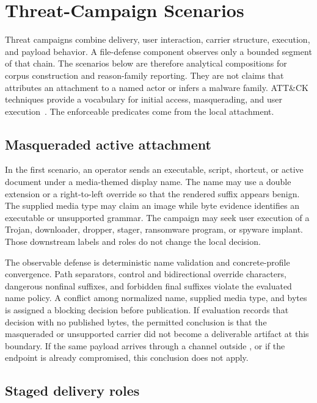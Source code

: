 \section{Threat-Campaign Scenarios}\label{sec:threat-campaigns}

Threat campaigns combine delivery, user interaction, carrier structure,
execution, and payload behavior. A file-defense component observes only a
bounded segment of that chain. The scenarios below are therefore analytical
compositions for corpus construction and reason-family reporting. They are not
claims that \AFD{} attributes an attachment to a named actor or infers a malware
family. ATT\&CK techniques provide a vocabulary for initial access,
masquerading, and user execution~\cite{mitreT1566001,mitreT1036002,
mitreT1036007,mitreT1036008,mitreT1204002}. The enforceable predicates come
from the local attachment.

\subsection{Masqueraded active attachment}

In the first scenario, an operator sends an executable, script, shortcut, or
active document under a media-themed display name. The name may use a double
extension or a right-to-left override so that the rendered suffix appears
benign. The supplied media type may claim an image while byte evidence identifies
an executable or unsupported grammar. The campaign may seek user execution of a
Trojan, downloader, dropper, stager, ransomware program, or spyware implant.
Those downstream labels and roles do not change the local decision.

The observable defense is deterministic name validation and concrete-profile
convergence. Path separators, control and bidirectional override characters,
dangerous nonfinal suffixes, and forbidden final suffixes violate the evaluated
name policy. A conflict among normalized name, supplied media type, and bytes
is assigned a blocking decision before publication. If evaluation records that
decision with no published bytes, the permitted conclusion is that the
masqueraded or unsupported carrier did not become a deliverable artifact at
this boundary. If the same payload arrives through a channel outside \AFD, or
if the endpoint is already compromised, this conclusion does not apply.

\subsection{Staged delivery roles}

